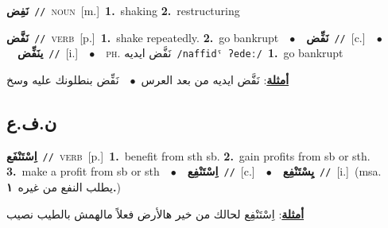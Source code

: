 \documentclass[10pt,a4paper,twoside]{article} %
\begin{document}
\begin{multicols}{2}
{\setlength\topsep{0pt}\textbf{\foreignlanguage{arabic}{نَفِض}}\ {\color{gray}\texttt{//}\color{black}}\ \textsc{noun}\ [m.]\ \textbf{1.}~shaking  \textbf{2.}~restructuring\ } \vspace{2mm}

{\setlength\topsep{0pt}\textbf{\foreignlanguage{arabic}{نَفَّض}}\ {\color{gray}\texttt{//}\color{black}}\ \textsc{verb}\ [p.]\ \textbf{1.}~shake repeatedly.  \textbf{2.}~go bankrupt\ \ $\bullet$\ \ \setlength\topsep{0pt}\textbf{\foreignlanguage{arabic}{نَفِّض}}\ {\color{gray}\texttt{//}\color{black}}\ [c.]\ \ $\bullet$\ \ \setlength\topsep{0pt}\textbf{\foreignlanguage{arabic}{ينَفِّض}}\ {\color{gray}\texttt{//}\color{black}}\ [i.]\ \ $\bullet$\ \ \textsc{ph.} \color{gray} \foreignlanguage{arabic}{نَفَّض ايديه}\color{black}\ {\color{gray}\texttt{/{\sffamily naffidˤ ʔedeː}/}\color{black}}\ \textbf{1.}~go bankrupt\  \begin{flushright}\color{gray}\foreignlanguage{arabic}{\textbf{\underline{\foreignlanguage{arabic}{أمثلة}}}: نَفَّض ايديه من بعد العرس\ $\bullet$\ \  نَفِّض بنطلونك عليه وسخ}\end{flushright}\color{black}} \vspace{2mm}

\vspace{-3mm}
\subsection*{\color{blue}\foreignlanguage{arabic}{ن.ف.ع}\color{blue}{}} 

{\setlength\topsep{0pt}\textbf{\foreignlanguage{arabic}{اِسْتَنْفَع}}\ {\color{gray}\texttt{//}\color{black}}\ \textsc{verb}\ [p.]\ \textbf{1.}~benefit from sth sb.  \textbf{2.}~gain profits from sb or sth.  \textbf{3.}~make a profit from sb or sth\ \ $\bullet$\ \ \setlength\topsep{0pt}\textbf{\foreignlanguage{arabic}{اِسْتَنْفِع}}\ {\color{gray}\texttt{//}\color{black}}\ [c.]\ \ $\bullet$\ \ \setlength\topsep{0pt}\textbf{\foreignlanguage{arabic}{يِسْتَنْفِع}}\ {\color{gray}\texttt{//}\color{black}}\ [i.]\ \color{gray}(msa. \foreignlanguage{arabic}{يطلب النفع من غيره}~\foreignlanguage{arabic}{\textbf{١.}})\color{black}\  \begin{flushright}\color{gray}\foreignlanguage{arabic}{\textbf{\underline{\foreignlanguage{arabic}{أمثلة}}}: اِسْتَنْفِع لحالك من خير هالأرض فعلاً مالهمش بالطيب نصيب}\end{flushright}\color{black}} \vspace{2mm}


\end{multicols}
\end{document}
